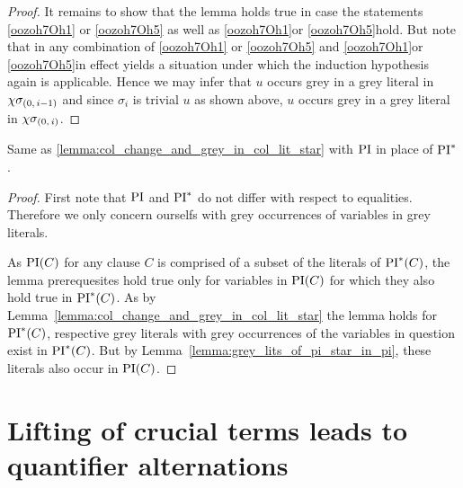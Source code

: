 \documentclass[,%
	draft=false,%
	numbers=noendperiod
	12pt,
	a4paper,
	oneside,%
	openany,
]{memoir}
\newcommand{\inv}{\ensuremath{\chi}}
\begin{document}
\begin{proof}
	It remains to show that the lemma holds true in case the statements \ref{oozoh7Oh1} or \ref{oozoh7Oh5} as well as \ref{oozoh7Oh1}\othercase or \ref{oozoh7Oh5}\othercase hold.
	But note that in any combination of \ref{oozoh7Oh1} or \ref{oozoh7Oh5} and \ref{oozoh7Oh1}\othercase or \ref{oozoh7Oh5}\othercase in effect yields a situation under which the induction hypothesis again is applicable.
	Hence we may infer that $u$ occurs grey in a grey literal in $\inv\sigmazmi$ and since $\sigma_i$ is trivial $u$ as shown above, $u$ occurs grey in a grey literal in $\inv\sigmazi$.
\end{proof}

\begin{lemma}
	\label{lemma:col_change_and_grey_in_col_lit}
	Same as \ref{lemma:col_change_and_grey_in_col_lit_star} with $\operatorname{PI}$ in place of $\operatorname{PI}^*$.
\end{lemma}
\begin{proof}
	First note that $\operatorname{PI}$ and $\operatorname{PI}^*$ do not differ with respect to equalities. Therefore we only concern ourselfs with grey occurrences of variables in grey literals.

	As $\operatorname{PI}(C)$ for any clause $C$ is comprised of a subset of the literals of $\operatorname{PI}^*(C)$, the lemma prerequesites hold true only for variables in $\operatorname{PI}(C)$ for which they also hold true in $\operatorname{PI}^*(C)$.
	As by Lemma~\ref{lemma:col_change_and_grey_in_col_lit_star} the lemma holds for $\operatorname{PI}^*(C)$, respective grey literals with grey occurrences of the variables in question exist in $\operatorname{PI}^*(C)$.
	But by Lemma~\ref{lemma:grey_lits_of_pi_star_in_pi}, these literals also occur in $\operatorname{PI}(C)$.
\end{proof}


\section{Lifting of crucial terms leads to quantifier alternations}
\end{document}
